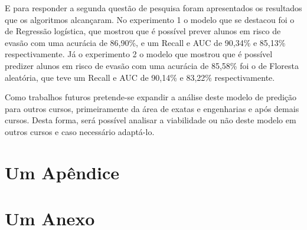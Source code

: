 \documentclass[diss,capa]{texufpel}
\begin{document}
E para responder a segunda questão de pesquisa foram apresentados os resultados que os algoritmos alcançaram.
No experimento 1 o modelo que se destacou foi o de Regressão logística, que mostrou que é possível prever alunos em risco de evasão com uma acurácia de 86,90\%, e um Recall e AUC de 90,34\% e 85,13\% respectivamente.
Já o experimento 2 o modelo que mostrou que é possível predizer alunos em risco de evasão com uma acurácia de 85,58\% foi o de Floresta aleatória, que teve um Recall e AUC de 90,14\% e 83,22\% respectivamente.

Como trabalhos futuros pretende-se expandir a análise deste modelo de predição para outros cursos, primeiramente da área de exatas e engenharias e após demais cursos. Desta forma, será possível analisar a viabilidade ou não deste modelo em outros cursos e caso necessário adaptá-lo.



 


\apendices

\chapter{Um Apêndice}

\anexos

\chapter{Um Anexo}
\end{document}
